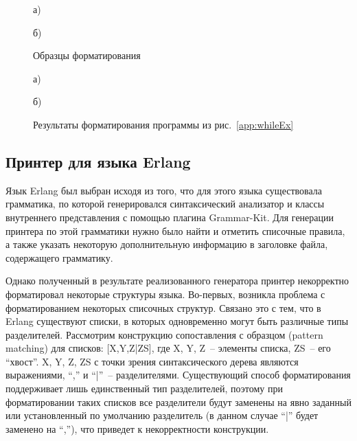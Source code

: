 \begin{figure}[h]
  \noindent
  \begin{minipage}{.4\textwidth}
    
    \caption*{а)}    
  \end{minipage}
  \hfill
  \begin{minipage}{.5\textwidth}
    
    \caption*{б)}
  \end{minipage}
  \caption{Образцы форматирования}
  \label{app:whileTs}
\end{figure}

\begin{figure}[h]
  \noindent
  \begin{minipage}{.4\textwidth}
    
    \caption*{а)}    
  \end{minipage}
  \hfill
  \begin{minipage}{.5\textwidth}
    
    \caption*{б)}    
  \end{minipage}
  \caption{Результаты форматирования программы из рис.~\ref{app:whileEx}}
  \label{app:whileRess}
\end{figure}

\subsection{Принтер для языка Erlang}
Язык Erlang был выбран исходя из того, что для этого языка существовала грамматика, по которой генерировался синтаксический анализатор и классы внутреннего представления с помощью плагина Grammar-Kit.
Для генерации принтера по этой грамматики нужно было найти и отметить списочные правила, а также указать некоторую дополнительную информацию в заголовке файла, содержащего грамматику.

Однако полученный в результате реализованного генератора принтер некорректно форматировал некоторые структуры языка.
Во-первых, возникла проблема с форматированием некоторых списочных структур.
Связано это с тем, что в Erlang существуют списки, в которых одновременно могут быть различные типы разделителей.
Рассмотрим конструкцию сопоставления с образцом (pattern matching) для списков: [X,Y,Z|ZS], где X, Y, Z~-- элементы списка, ZS~-- его ``хвост''.
X, Y, Z, ZS с точки зрения синтаксического дерева являются выражениями, ``,'' и ``|''~-- разделителями.
Существующий способ форматирования поддерживает лишь единственный тип разделителей, поэтому при форматировании таких списков все разделители будут заменены на явно заданный или установленный по умолчанию разделитель (в данном случае ``|'' будет заменено на ``,''), что приведет к некорректности конструкции.

